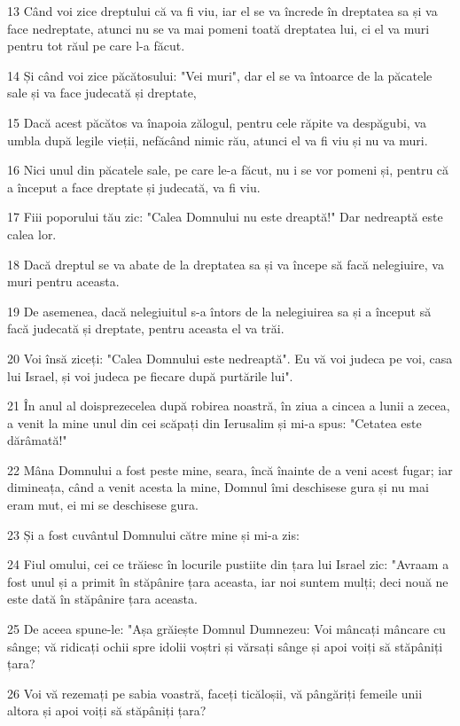 \par 13 Când voi zice dreptului că va fi viu, iar el se va încrede în dreptatea sa și va face nedreptate, atunci nu se va mai pomeni toată dreptatea lui, ci el va muri pentru tot răul pe care l-a făcut.
\par 14 Și când voi zice păcătosului: "Vei muri", dar el se va întoarce de la păcatele sale și va face judecată și dreptate,
\par 15 Dacă acest păcătos va înapoia zălogul, pentru cele răpite va despăgubi, va umbla după legile vieții, nefăcând nimic rău, atunci el va fi viu și nu va muri.
\par 16 Nici unul din păcatele sale, pe care le-a făcut, nu i se vor pomeni și, pentru că a început a face dreptate și judecată, va fi viu.
\par 17 Fiii poporului tău zic: "Calea Domnului nu este dreaptă!" Dar nedreaptă este calea lor.
\par 18 Dacă dreptul se va abate de la dreptatea sa și va începe să facă nelegiuire, va muri pentru aceasta.
\par 19 De asemenea, dacă nelegiuitul s-a întors de la nelegiuirea sa și a început să facă judecată și dreptate, pentru aceasta el va trăi.
\par 20 Voi însă ziceți: "Calea Domnului este nedreaptă". Eu vă voi judeca pe voi, casa lui Israel, și voi judeca pe fiecare după purtările lui".
\par 21 În anul al doisprezecelea după robirea noastră, în ziua a cincea a lunii a zecea, a venit la mine unul din cei scăpați din Ierusalim și mi-a spus: "Cetatea este dărâmată!"
\par 22 Mâna Domnului a fost peste mine, seara, încă înainte de a veni acest fugar; iar dimineața, când a venit acesta la mine, Domnul îmi deschisese gura și nu mai eram mut, ei mi se deschisese gura.
\par 23 Și a fost cuvântul Domnului către mine și mi-a zis:
\par 24 Fiul omului, cei ce trăiesc în locurile pustiite din țara lui Israel zic: "Avraam a fost unul și a primit în stăpânire țara aceasta, iar noi suntem mulți; deci nouă ne este dată în stăpânire țara aceasta.
\par 25 De aceea spune-le: "Așa grăiește Domnul Dumnezeu: Voi mâncați mâncare cu sânge; vă ridicați ochii spre idolii voștri și vărsați sânge și apoi voiți să stăpâniți țara?
\par 26 Voi vă rezemați pe sabia voastră, faceți ticăloșii, vă pângăriți femeile unii altora și apoi voiți să stăpâniți țara?
